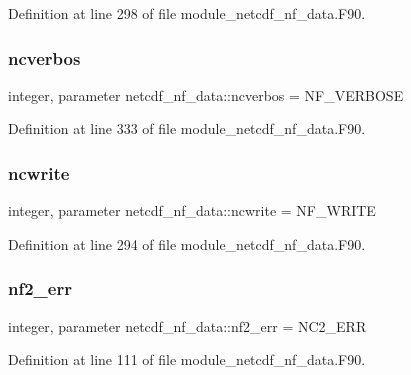 Definition at line 298 of file module\+\_\+netcdf\+\_\+nf\+\_\+data.\+F90.

\mbox{\label{namespacenetcdf__nf__data_ac74be92e9885bedd9ae5a5640352740e}} 
\subsubsection{\texorpdfstring{ncverbos}{ncverbos}}
{\footnotesize\ttfamily integer, parameter netcdf\+\_\+nf\+\_\+data\+::ncverbos = N\+F\+\_\+\+V\+E\+R\+B\+O\+SE}



Definition at line 333 of file module\+\_\+netcdf\+\_\+nf\+\_\+data.\+F90.

\mbox{\label{namespacenetcdf__nf__data_a8531d390a08862ce18bcb314168801cc}} 
\subsubsection{\texorpdfstring{ncwrite}{ncwrite}}
{\footnotesize\ttfamily integer, parameter netcdf\+\_\+nf\+\_\+data\+::ncwrite = N\+F\+\_\+\+W\+R\+I\+TE}



Definition at line 294 of file module\+\_\+netcdf\+\_\+nf\+\_\+data.\+F90.

\mbox{\label{namespacenetcdf__nf__data_a584209e7c8aad290efa2f2ade190414d}} 
\subsubsection{\texorpdfstring{nf2\+\_\+err}{nf2\_err}}
{\footnotesize\ttfamily integer, parameter netcdf\+\_\+nf\+\_\+data\+::nf2\+\_\+err = N\+C2\+\_\+\+E\+RR}



Definition at line 111 of file module\+\_\+netcdf\+\_\+nf\+\_\+data.\+F90.


